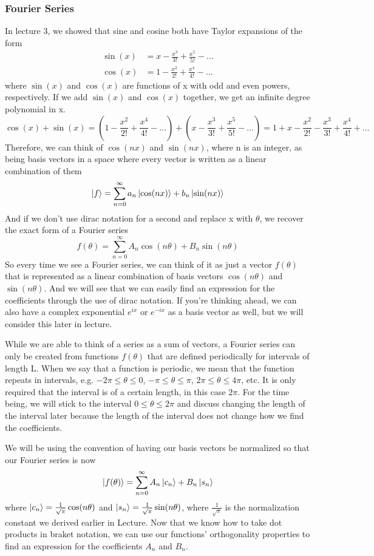 \documentclass{article}
\newcommand{\be}{\begin{equation}}
\newcommand{\ee}{\end{equation}}
\begin{document}
\subsubsection*{Fourier Series}
In lecture 3, we showed that sine and cosine both have Taylor expansions of the form
\be
  \begin{split}
    \sin(x) &= x - \frac{x^3}{3!} + \frac{x^5}{5!} - \hdots \\
    \cos(x) &= 1 - \frac{x^2}{2!} + \frac{x^4}{4!} - \hdots
  \end{split}
\ee
where $\sin(x)$ and $\cos(x)$ are functions of x with odd and even powers, respectively.
If we add $\sin(x)$ and $\cos(x)$ together, we get an infinite degree polynomial in x.
\be
  \cos(x) + \sin(x) = (1 - \frac{x^2}{2!} + \frac{x^4}{4!} - \hdots) + (x - \frac{x^3}{3!} + \frac{x^5}{5!} - \hdots) = 1 + x - \frac{x^2}{2!} - \frac{x^3}{3!} + \frac{x^4}{4!} + \hdots
\ee
Therefore, we can think of $\cos(nx)$ and $\sin(nx)$, where n is an integer, as being basis vectors in a space where every vector is written as a linear combination of them
\be
  \ket{f} = \sum_{n = 0}^{\infty} a_n \ket{\cos(nx)} + b_n \ket{\sin(nx)}
\ee
And if we don't use dirac notation for a second and replace x with $\theta$, we recover the exact form of a Fourier series
\be
  f(\theta) = \sum_{n = 0}^{\infty} A_n \cos(n \theta) + B_n \sin(n \theta)
\ee
So every time we see a Fourier series, we can think of it as just a vector $f(\theta)$ that is represented as a linear combination of basis vectors $\cos(n \theta)$ and $\sin(n \theta)$.
And we will see that we can easily find an expression for the coefficients through the use of dirac notation.
If you're thinking ahead, we can also have a complex exponential $e^{ix}$ or $e^{-ix}$ as a basis vector as well, but we will consider this later in lecture.

While we are able to think of a series as a sum of vectors, a Fourier series can only be created from functions $f(\theta)$ that are defined periodically for intervals of length L.
When we say that a function is periodic, we mean that the function repeats in intervals, e.g. $- 2\pi \leq \theta \leq 0$, $- \pi \leq \theta \leq \pi$, $2 \pi \leq \theta \leq 4 \pi $, etc.
It is only required that the interval is of a certain length, in this case $2 \pi$.
For the time being, we will stick to the interval $0 \leq \theta \leq 2 \pi$ and discuss changing the length of the interval later because the length of the interval does not change how we find the coefficients.

We will be using the convention of having our basis vectors be normalized so that our Fourier series is now
\be
  \ket{f(\theta)} = \sum_{n=0}^{\infty} A_n \ket{c_n} + B_n \ket{s_n}
\ee
where $\ket{c_n} = \frac{1}{\sqrt{\pi}} \cos(n \theta)$ and $\ket{s_n} = \frac{1}{\sqrt{\pi}} \sin(n \theta)$, where $\frac{1}{\sqrt{\pi}}$ is the normalization constant we derived earlier in Lecture.
Now that we know how to take dot products in braket notation, we can use our functions' orthogonality properties to find an expression for the coefficients $A_n$ and $B_n$.
\end{document}
